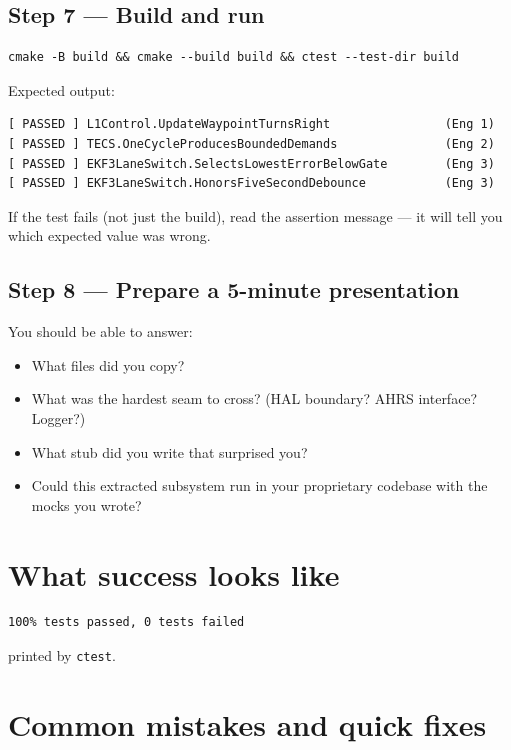 \documentclass[a4paper,11pt,twoside]{article}
\begin{document}
\subsection*{Step 7 --- Build and run}
\begin{Verbatim}[frame=single,fontsize=\small]
cmake -B build && cmake --build build && ctest --test-dir build
\end{Verbatim}
Expected output:
\begin{Verbatim}[frame=single,fontsize=\small]
[ PASSED ] L1Control.UpdateWaypointTurnsRight                (Eng 1)
[ PASSED ] TECS.OneCycleProducesBoundedDemands               (Eng 2)
[ PASSED ] EKF3LaneSwitch.SelectsLowestErrorBelowGate        (Eng 3)
[ PASSED ] EKF3LaneSwitch.HonorsFiveSecondDebounce           (Eng 3)
\end{Verbatim}
If the test fails (not just the build), read the assertion message --- it will tell you which expected value was wrong.

\subsection*{Step 8 --- Prepare a 5-minute presentation}
You should be able to answer:
\begin{itemize}
  \item What files did you copy?
  \item What was the hardest seam to cross? (HAL boundary? AHRS interface? Logger?)
  \item What stub did you write that surprised you?
  \item Could this extracted subsystem run in your proprietary codebase with the mocks you wrote?
\end{itemize}

\section*{What success looks like}
\begin{Verbatim}[frame=single,fontsize=\small]
100% tests passed, 0 tests failed
\end{Verbatim}
printed by \texttt{ctest}.

\section*{Common mistakes and quick fixes}
\end{document}
